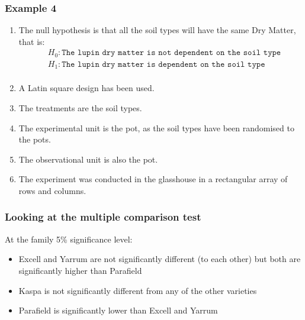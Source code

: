 \begin{frame}\frametitle{Example 4}
\begin{enumerate}
\item The null hypothesis is that all the soil types will have the same Dry Matter, that is:
\begin{align*}
& H_0: \texttt{The lupin dry matter is not dependent on the soil type}\\
& H_1:\texttt{The lupin dry matter is dependent on the soil type}\\
\end{align*}
\item A Latin square design has been used. \\
\item The treatments are the soil types.\\
\item The experimental unit is the pot, as the soil types have been randomised to the pots.\\
\item The observational unit is also the pot.\\
\item The experiment was conducted in the glasshouse in a rectangular array of rows and columns.\\
\end{enumerate}
\end{frame}


\begin{frame}\frametitle{Looking at the multiple comparison test}
At the family 5\% significance level:
\begin{itemize}
\item Excell and Yarrum are not significantly different (to each other)
but both are significantly higher than Parafield
\item Kaspa is not significantly different from any of the other varieties
\item Parafield is significantly lower than Excell and Yarrum
\end{itemize}
\end{frame}


